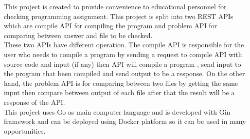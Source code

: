
This project is created to provide convenience to educational personnel for checking programming assignment. This project is split into two REST APIs which are compile API for compiling the program and problem API for comparing between answer and file to be checked. \\
\indent These two APIs have different operation. The compile API is responsible for the user who needs to compile a program by sending a request to compile API with source code and input (if any) then API will compile a program , send input to the program that been compiled and send output to be a response. On the other hand, the problem API is for comparing between two files by getting the same input then compare between output of each file after that the result will be a response of the API. \\
\indent This project uses Go as main computer language and is developed with Gin framework and can be deployed using Docker platform so it can be used in many opportunities.
